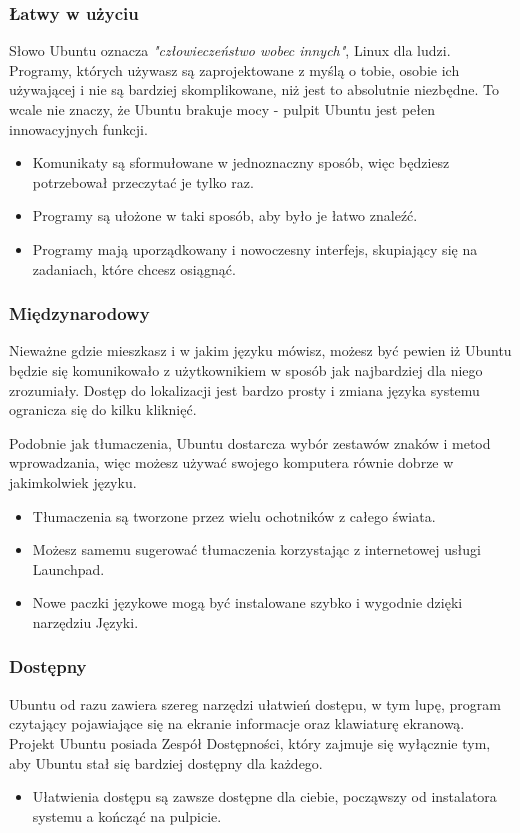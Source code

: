 \subsubsection{Łatwy w użyciu}
Słowo Ubuntu oznacza \emph{"człowieczeństwo wobec innych"}, Linux dla ludzi. Programy, których używasz są zaprojektowane z myślą o tobie, osobie ich używającej i nie są bardziej skomplikowane, niż jest to absolutnie niezbędne. To wcale nie znaczy, że Ubuntu brakuje mocy - pulpit Ubuntu jest pełen innowacyjnych funkcji.
\begin{itemize}
\item Komunikaty są sformułowane w jednoznaczny sposób, więc będziesz potrzebował przeczytać je tylko raz.
\item Programy są ułożone w taki sposób, aby było je łatwo znaleźć.
\item Programy mają uporządkowany i nowoczesny interfejs, skupiający się na zadaniach, które chcesz osiągnąć.
\end{itemize}

\subsubsection{Międzynarodowy}
Nieważne gdzie mieszkasz i w jakim języku mówisz, możesz być pewien iż Ubuntu będzie się komunikowało z użytkownikiem w sposób jak najbardziej dla niego zrozumiały. Dostęp do lokalizacji jest bardzo prosty i zmiana języka systemu ogranicza się do kilku kliknięć. 

Podobnie jak tłumaczenia, Ubuntu dostarcza wybór zestawów znaków i metod wprowadzania, więc możesz używać swojego komputera równie dobrze w jakimkolwiek języku.
\begin{itemize}
\item Tłumaczenia są tworzone przez wielu ochotników z całego świata.
\item Możesz samemu sugerować tłumaczenia korzystając z internetowej usługi Launchpad.
\item Nowe paczki językowe mogą być instalowane szybko i wygodnie dzięki narzędziu Języki.
\end{itemize}

\subsubsection{Dostępny}
Ubuntu od razu zawiera szereg narzędzi ułatwień dostępu, w tym lupę, program czytający pojawiające się na ekranie informacje oraz klawiaturę ekranową. Projekt Ubuntu posiada Zespół Dostępności, który zajmuje się wyłącznie tym, aby Ubuntu stał się bardziej dostępny dla każdego.
\begin{itemize}
\item Ułatwienia dostępu są zawsze dostępne dla ciebie, począwszy od instalatora systemu a kończąć na pulpicie.
\end{itemize}

